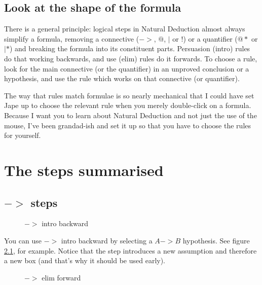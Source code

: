 \documentclass[11pt]{book}
\newcommand{\figref}[1]{figure \ref{fig:#1}}
\begin{document}
\section{Look at the shape of the formula}

There is a general principle: logical steps 
in Natural Deduction almost always simplify a formula, removing 
a connective ($->$, $@$, $|$ or $!$) or a quantifier ($@*$ 
or $|*$) and breaking the formula into its constituent parts. Persuasion 
(intro) rules do that working backwards, and use (elim) rules 
do it forwards. To choose a rule, look for the main connective 
(or the quantifier) in an unproved conclusion or a hypothesis, 
and use the rule which works on that connective (or quantifier).

The way that rules match formulae is so nearly mechanical 
that I could have set Jape up to choose the relevant rule 
when you merely double-click on a formula. Because I want you 
to learn about Natural Deduction and not just the use of the 
mouse, I've been grandad-ish and set it up so that you have to 
choose the rules for yourself.

\chapter{The steps summarised}

\section{$->$ steps}

\begin{figure}
\centering
{}
\qquad
{}
\caption{$->$ intro backward}
\label{fig:->introbackward}
\end{figure}

You can use $->$ intro backward by selecting a $A->B$ hypothesis. See \figref{->introbackward}, for example. Notice that the step introduces a new assumption and therefore a new box (and that's why it should be used early).

\begin{figure}
\centering
{}
\qquad
{}
\caption{$->$ elim forward}
\label{fig:->elimforward}
\end{figure}
\end{document}
